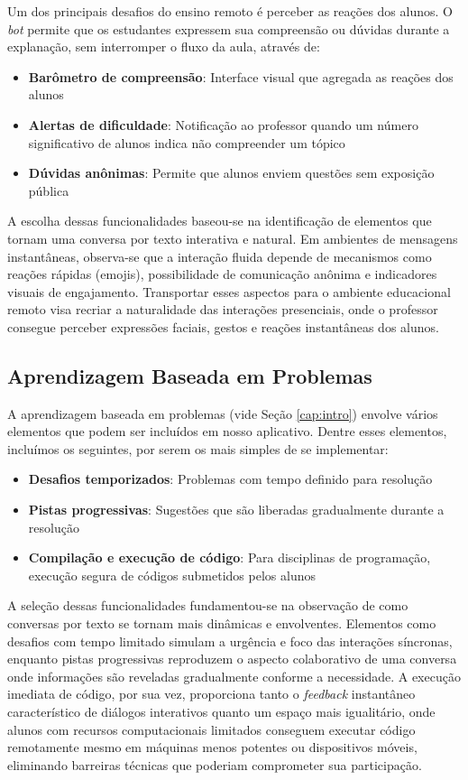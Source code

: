 Um dos principais desafios do ensino remoto é perceber as reações dos alunos. O
\textit{bot} permite que os estudantes expressem sua compreensão ou dúvidas
durante a explanação, sem interromper o fluxo da aula, através de:

\begin{itemize}
\item \textbf{Barômetro de compreensão}: Interface visual que agregada as
reações dos alunos
\item \textbf{Alertas de dificuldade}: Notificação ao professor quando um número
significativo de alunos indica não compreender um tópico
\item \textbf{Dúvidas anônimas}: Permite que alunos enviem questões sem
exposição pública
\end{itemize}

A escolha dessas funcionalidades baseou-se na identificação de elementos que
tornam uma conversa por texto interativa e natural. Em ambientes de mensagens
instantâneas, observa-se que a interação fluida depende de mecanismos como
reações rápidas (emojis), possibilidade de comunicação anônima e indicadores
visuais de engajamento. Transportar esses aspectos para o ambiente educacional
remoto visa recriar a naturalidade das interações presenciais, onde o professor
consegue perceber expressões faciais, gestos e reações instantâneas dos
alunos\cite{huang2021}.

\subsection{Aprendizagem Baseada em Problemas}
\label{subsec:pbl}

A aprendizagem baseada em problemas (vide Seção \ref{cap:intro}) envolve vários
elementos que podem ser incluídos em nosso aplicativo. Dentre esses elementos,
incluímos os seguintes, por serem os mais simples de se implementar:

\begin{itemize}
\item \textbf{Desafios temporizados}: Problemas com tempo definido para
resolução
\item \textbf{Pistas progressivas}: Sugestões que são liberadas gradualmente
durante a resolução
\item \textbf{Compilação e execução de código}: Para disciplinas de programação,
execução segura de códigos submetidos pelos alunos
\end{itemize}

A seleção dessas funcionalidades fundamentou-se na observação de como conversas
por texto se tornam mais dinâmicas e envolventes. Elementos como desafios com
tempo limitado simulam a urgência e foco das interações síncronas, enquanto
pistas progressivas reproduzem o aspecto colaborativo de uma conversa onde
informações são reveladas gradualmente conforme a necessidade. A execução
imediata de código, por sua vez, proporciona tanto o \textit{feedback}
instantâneo característico de diálogos interativos quanto um espaço mais
igualitário, onde alunos com recursos computacionais limitados conseguem
executar código remotamente mesmo em máquinas menos potentes ou dispositivos
móveis, eliminando barreiras técnicas que poderiam comprometer sua
participação\cite{fabiane2024}.

